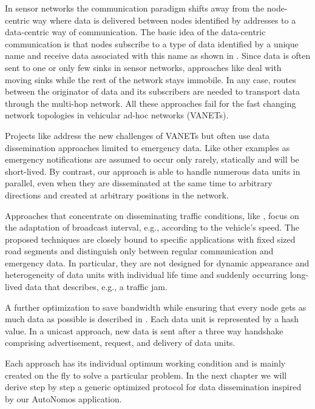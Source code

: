 \documentclass{acmrip}
\begin{document}
In sensor networks the communication paradigm shifts away from the
node-centric way where data is delivered between nodes identified by
addresses to a data-centric way of communication. The basic idea of
the data-centric communication is that nodes subscribe to a type of
data identified by a unique name and receive data associated with
this name as shown in \cite{638335,can,774785}.
Since data is often sent to one or only few sinks in sensor
networks, approaches like \cite{YLC02} deal with moving sinks while
the rest of the network stays immobile. In any case, routes between
the originator of data and its subscribers are needed to transport
data through the multi-hop network. All these approaches fail for
the fast changing network topologies in vehicular ad-hoc networks
(VANETs).

Projects like \cite{FLEETNET} address the new challenges of VANETs
but often use data dissemination approaches limited to emergency
data. Like other examples as \cite{1023879,OKG2006} emergency
notifications are assumed to occur only rarely, statically and will
be short-lived. By contrast, our approach is able to handle numerous
data units in parallel, even when they are disseminated at the same
time to arbitrary directions and created at arbitrary positions in
the network.

Approaches that concentrate on disseminating traffic conditions,
like \cite{wischhof03adaptive,xuba2006}, focus on the adaptation of
broadcast interval, e.g., according to the vehicle's speed. The
proposed techniques are closely bound to specific applications with
fixed sized road segments and distinguish only between regular
communication and emergency data. In particular, they are not
designed for dynamic appearance and heterogeneity of data units with
individual life time and suddenly occurring long-lived data that
describes, e.g., a traffic jam.

A further optimization to save bandwidth while ensuring that every
node gets as much data as possible is described in \cite{313529}.
Each data unit is represented by a hash value. In a unicast
approach, new data is sent after a three way handshake comprising
advertisement, request, and delivery of data units.

Each approach has its individual optimum working condition and is
mainly created on the fly to solve a particular problem. In the next
chapter we will derive step by step a generic optimized protocol for
data dissemination inspired by our AutoNomos application.
\end{document}
